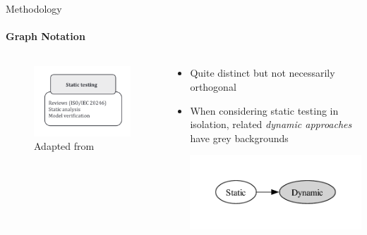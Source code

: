 \documentclass{beamer}
\begin{document}
\begin{frame}{Methodology}
    \framesubtitle{Graph Notation}
    \begin{columns}[c]
        \begin{column}{.4\textwidth}
            \begin{figure}
                \centering
                \includegraphics[width=\linewidth]{assets/images/test approach static testing}
                \caption{\tiny Adapted from \citep[Fig.~2]{IEEE2022}}
            \end{figure}
        \end{column}
        \begin{column}{.6\textwidth}
            \begin{itemize}
                \item \pause Quite distinct but not necessarily orthogonal
                \item \pause When considering static testing in isolation,
                      related \emph{dynamic approaches} have grey backgrounds

                      \vspace{-0.5cm}
                      \includegraphics[width=\linewidth]{assets/graphs/manual/catRels9.pdf}
            \end{itemize}
        \end{column}
    \end{columns}
\end{frame}
\end{document}
